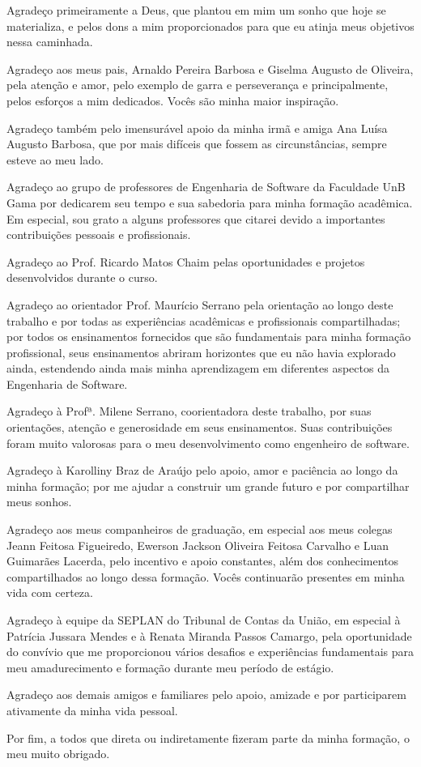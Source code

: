 \begin{agradecimentos}

Agradeço primeiramente a Deus, que plantou em mim um sonho que hoje se materializa, e pelos dons a mim proporcionados para que eu atinja meus objetivos nessa caminhada.

Agradeço aos meus pais, Arnaldo Pereira Barbosa e Giselma Augusto de Oliveira, pela atenção e amor, pelo exemplo de garra e perseverança e principalmente, pelos esforços a mim dedicados. Vocês são minha maior inspiração.

Agradeço também pelo imensurável apoio da minha irmã e amiga Ana Luísa Augusto Barbosa, que por mais difíceis que fossem as circunstâncias, sempre esteve ao meu lado.

Agradeço ao grupo de professores de Engenharia de Software da Faculdade UnB Gama por dedicarem seu tempo e sua sabedoria para minha formação acadêmica. Em especial, sou grato a alguns professores que citarei devido a importantes contribuições pessoais e profissionais.

Agradeço ao Prof. Ricardo Matos Chaim pelas oportunidades e projetos desenvolvidos durante o curso.

Agradeço ao orientador Prof. Maurício Serrano pela orientação ao longo deste trabalho e por todas as experiências acadêmicas e profissionais compartilhadas; por todos os ensinamentos fornecidos que são fundamentais para minha formação profissional, seus ensinamentos abriram horizontes que eu não havia explorado ainda, estendendo ainda mais minha aprendizagem em diferentes aspectos da Engenharia de Software.

Agradeço à Profª. Milene Serrano, coorientadora deste trabalho, por suas orientações, atenção e generosidade em seus ensinamentos. Suas contribuições foram muito valorosas para o meu desenvolvimento como engenheiro de software.

Agradeço à Karolliny Braz de Araújo pelo apoio, amor e paciência ao longo da minha formação; por me ajudar a construir um grande futuro e por compartilhar meus sonhos. 

Agradeço aos meus companheiros de graduação, em especial aos meus colegas Jeann Feitosa Figueiredo, Ewerson Jackson Oliveira Feitosa Carvalho e Luan Guimarães Lacerda, pelo incentivo e apoio constantes, além dos conhecimentos compartilhados ao longo dessa formação. Vocês continuarão presentes em minha vida com certeza. 

Agradeço à equipe da SEPLAN do Tribunal de Contas da União, em especial à Patrícia Jussara Mendes e à Renata Miranda Passos Camargo, pela oportunidade do convívio que me proporcionou vários desafios e experiências fundamentais para meu amadurecimento e formação durante meu período de estágio.

Agradeço aos demais amigos e familiares pelo apoio, amizade e por participarem ativamente da minha vida pessoal.

Por fim, a todos que direta ou indiretamente fizeram parte da minha formação, o meu muito obrigado.

\end{agradecimentos}
